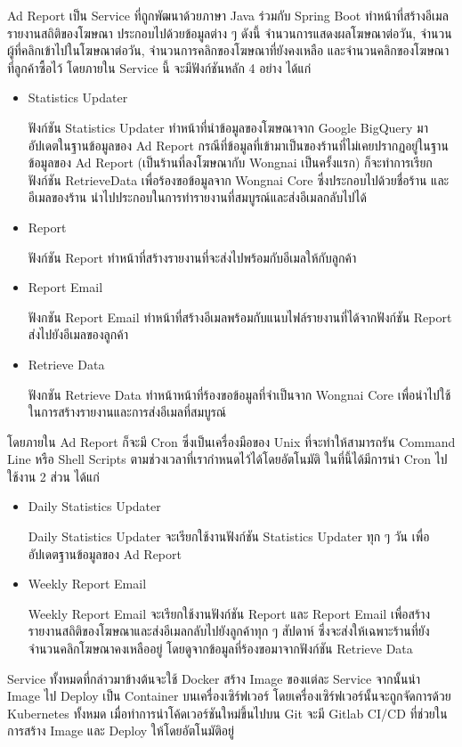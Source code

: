 \begin{enumerate}
	Ad Report เป็น Service ที่ถูกพัฒนาด้วยภาษา Java ร่วมกับ Spring Boot ทำหน้าที่สร้างอีเมลรายงานสถิติของโฆษณา ประกอบไปด้วยข้อมูลต่าง ๆ ดังนี้ จำนวนการแสดงผลโฆษณาต่อวัน, จำนวนผู้ที่คลิกเข้าไปในโฆษณาต่อวัน, จำนวนการคลิกของโฆษณาที่ยังคงเหลือ และจำนวนคลิกของโฆษณาที่ลูกค้าซื้อไว้ โดยภายใน Service นี้ จะมีฟังก์ชันหลัก 4 อย่าง ได้แก่
	\begin{itemize}
		\item Statistics Updater
		
		 ฟังก์ชัน Statistics Updater ทำหน้าที่นำข้อมูลของโฆษณาจาก Google BigQuery มาอัปเดตในฐานข้อมูลของ Ad Report กรณีที่ข้อมูลที่เข้ามาเป็นของร้านที่ไม่เคยปรากฏอยู่ในฐานข้อมูลของ Ad Report (เป็นร้านที่ลงโฆษณากับ Wongnai เป็นครั้งแรก) ก็จะทำการเรียกฟังก์ชัน RetrieveData เพื่อร้องขอข้อมูลจาก Wongnai Core ซึ่งประกอบไปด้วยชื่อร้าน และอีเมลของร้าน นำไปประกอบในการทำรายงานที่สมบูรณ์และส่งอีเมลกลับไปได้
		\item Report
		
		ฟังก์ชัน Report ทำหน้าที่สร้างรายงานที่จะส่งไปพร้อมกับอีเมลให้กับลูกค้า
		\item Report Email
		
		ฟังกชัน Report Email ทำหน้าที่สร้างอีเมลพร้อมกับแนบไฟล์รายงานที่ได้จากฟังก์ชัน Report ส่งไปยังอีเมลของลูกค้า
		\item Retrieve Data
		
		ฟังกชัน Retrieve Data ทำหน้าหน้าที่ร้องขอข้อมูลที่จำเป็นจาก Wongnai Core เพื่อนำไปใช้ในการสร้างรายงานและการส่งอีเมลที่สมบูรณ์
	\end{itemize}
	โดยภายใน Ad Report ก็จะมี Cron ซึ่งเป็นเครื่องมือของ Unix ที่จะทำให้สามารถรัน Command Line หรือ Shell Scripts ตามช่วงเวลาที่เรากำหนดไว้ได้โดยอัตโนมัติ ในที่นี้ได้มีการนำ Cron ไปใช้งาน 2 ส่วน ได้แก่
	\begin{itemize}
		\item Daily Statistics Updater
		
		Daily Statistics Updater จะเรียกใช้งานฟังก์ชัน Statistics Updater ทุก ๆ วัน เพื่ออัปเดตฐานข้อมูลของ Ad Report
		\item Weekly Report Email
		
		Weekly Report Email จะเรียกใช้งานฟังก์ชัน Report และ Report Email เพื่อสร้างรายงานสถิติของโฆษณาและส่งอีเมลกลับไปยังลูกค้าทุก ๆ สัปดาห์ ซึ่งจะส่งให้เฉพาะร้านที่ยังจำนวนคลิกโฆษณาคงเหลืออยู่ โดยดูจากข้อมูลที่ร้องขอมาจากฟังก์ชัน Retrieve Data
	\end{itemize}
\end{enumerate}

Service ทั้งหมดที่กล่าวมาข้างต้นจะใช้ Docker สร้าง Image ของแต่ละ Service จากนั้นนำ Image ไป Deploy เป็น Container บนเครื่องเซิร์ฟเวอร์ โดยเครื่องเซิร์ฟเวอร์นั้นจะถูกจัดการด้วย Kubernetes ทั้งหมด  เมื่อทำการนำโค้ดเวอร์ชันใหม่ขึ้นไปบน Git จะมี Gitlab CI/CD ที่ช่วยในการสร้าง Image และ Deploy ให้โดยอัตโนมัติอยู่

